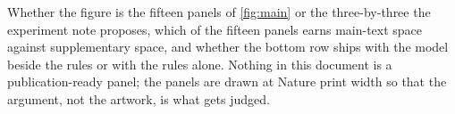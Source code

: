  Whether the figure is the fifteen panels of
\cref{fig:main} or the three-by-three the experiment note proposes, which of the fifteen
panels earns main-text space against supplementary space, and whether the bottom row
ships with the model beside the rules or with the rules alone. Nothing in this document
is a publication-ready panel; the panels are drawn at Nature print width so that the
argument, not the artwork, is what gets judged.
